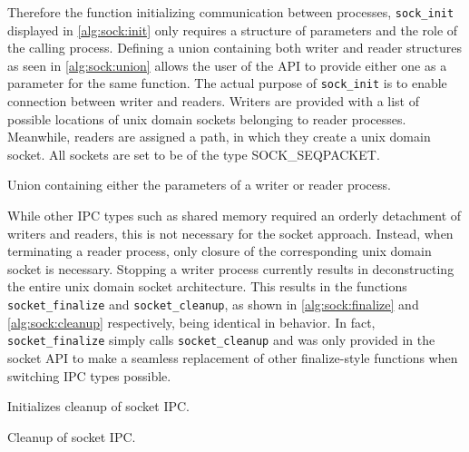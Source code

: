 Therefore the function initializing communication between processes, \texttt{sock\_init} displayed in \ref{alg:sock:init} only requires a structure of parameters and the role of the calling process.
Defining a union containing both writer and reader structures as seen in \ref{alg:sock:union} allows the user of the API to provide either one as a parameter for the same function.
The actual purpose of \texttt{sock\_init} is to enable connection between writer and readers.
Writers are provided with a list of possible locations of unix domain sockets belonging to reader processes.
Meanwhile, readers are assigned a path, in which they create a unix domain socket.
All sockets are set to be of the type SOCK\_SEQPACKET.

\begin{algorithm}[h!]
    
    \caption[Socket: Union for flexible function calling]{Union containing either the parameters of a writer or reader process.}
    \label{alg:sock:union}
\end{algorithm}

While other IPC types such as shared memory required an orderly detachment of writers and readers, this is not necessary for the socket approach.
Instead, when terminating a reader process, only closure of the corresponding unix domain socket is necessary.
Stopping a writer process currently results in deconstructing the entire unix domain socket architecture.
This results in the functions \texttt{socket\_finalize} and \texttt{socket\_cleanup}, as shown in \ref{alg:sock:finalize} and \ref{alg:sock:cleanup} respectively, being identical in behavior.
In fact, \texttt{socket\_finalize} simply calls \texttt{socket\_cleanup} and was only provided in the socket API to make a seamless replacement of other finalize-style functions when switching IPC types possible.

\begin{algorithm}[h!]
    
    \caption[Socket: Socket finalization]{Initializes cleanup of socket IPC.}
    \label{alg:sock:finalize}
\end{algorithm}

\begin{algorithm}[h!]
    
    \caption[Socket: Socket cleanup]{Cleanup of socket IPC.}
    \label{alg:sock:cleanup}
\end{algorithm}

